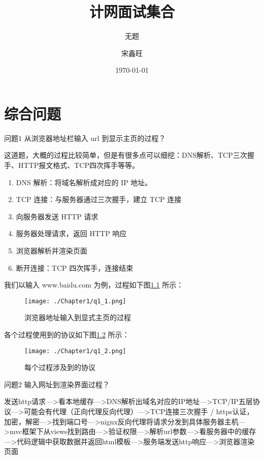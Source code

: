 \documentclass[cn,11pt,color=blue]{elegantbook}
\title{计网面试集合}
\subtitle{无题}
\author{宋鑫旺}
\institute{CoderHub}
\date{\today}
\begin{document}
	

\maketitle
\tableofcontents


\mainmatter
\hypersetup{pageanchor=true}

\chapter{综合问题}

\begin{custom}{问题1}
从浏览器地址栏输入 url 到显示主页的过程？
\end{custom}

\begin{solution}
这道题，大概的过程比较简单，但是有很多点可以细挖：DNS解析、TCP三次握手、HTTP报文格式、TCP四次挥手等等。
\begin{enumerate}
\item DNS 解析：将域名解析成对应的 IP 地址。
\item TCP 连接：与服务器通过三次握手，建立 TCP 连接
\item 向服务器发送 HTTP 请求
\item 服务器处理请求，返回 HTTP 响应
\item 浏览器解析并渲染页面
\item 断开连接：TCP 四次挥手，连接结束
\end{enumerate}

我们以输入 www.baidu.com 为例，过程如下图\ref{fig1_1} 所示：
\begin{figure}[htbp]
\centering
\texttt{[image: ./Chapter1/q1\_1.png]}
\caption{浏览器地址输入到显式主页的过程}
\label{fig1_1}
\end{figure}

各个过程使用到的协议如下图\ref{fig1_2} 所示：
\begin{figure}[htbp]
\centering
\texttt{[image: ./Chapter1/q1\_2.png]}
\caption{每个过程涉及到的协议}
\label{fig1_2}
\end{figure}
\end{solution}

\begin{custom}{问题2}
输入网址到渲染界面过程？
\end{custom}
\begin{solution}
发送http请求--->看本地缓存--->DNS解析出域名对应的IP地址--->TCP/IP五层协议--->可能会有代理（正向代理反向代理）--->TCP连接三次握手 / https认证，加密，解密--->找到端口号--->nignx反向代理将请求分发到具体服务器主机--->mvc框架下从views找到路由--->验证权限--->解析url参数--->看服务器中的缓存--->代码逻辑中获取数据并返回html模板--->服务端发送http响应--->浏览器渲染页面
\end{solution}
\end{document}
